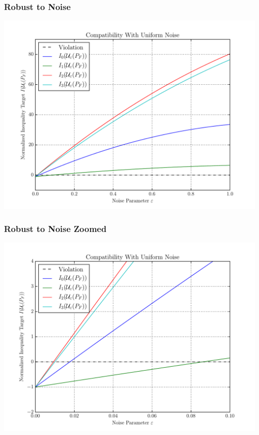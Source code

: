 \documentclass[
    hyperref={bookmarks=false},%
    xcolor={dvipsnames},
]{beamer}
\begin{document}
\begin{frame}
    \frametitle{Robust to Noise}
    \begin{center}
        \includegraphics[width=\linewidth]{../../figures/noise/four_rep_inequalities_uniform_noise.pdf}
    \end{center}
\end{frame}

\begin{frame}
    \frametitle{Robust to Noise Zoomed}
    \begin{center}
        \includegraphics[width=\linewidth]{../../figures/noise/four_rep_inequalities_uniform_noise_zoomed.pdf}
    \end{center}
\end{frame}
\end{document}

